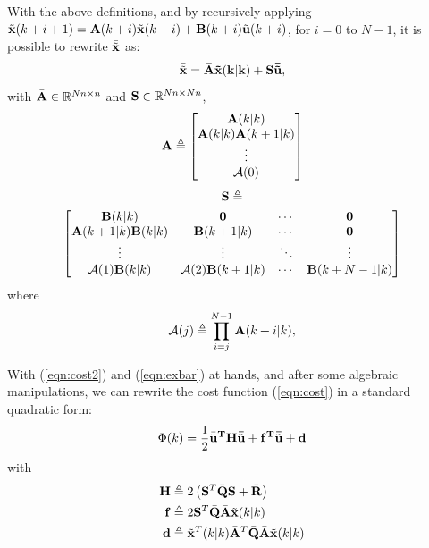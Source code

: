 \documentclass[twocolumn]{IEEEtran} %
\newcommand\real{\mathbb{R}}
\begin{document}
With the above definitions, and by recursively applying $\tilde{\bf x}(k+i+1)={\bf A}(k+i)\tilde{\bf x}(k+i)+{\bf B}(k+i)\tilde{\bf u}(k+i)$, for $i=0$ to $N-1$, it is possible to rewrite $\bar{\tilde{\bf x}}$ as:
\begin{equation}\label{eqn:exbar}
	\bar{\tilde{\bf x}}=\bar{\bf A}\tilde{\bf x}(k|k)+{\bf S}\bar{\tilde{\bf u}},
\end{equation}
with $\bar{\bf A}\in\real^{Nn\times n}$ and ${\bf S}\in\real^{Nn\times Nn}$,
\begin{equation*}
	\bar{\bf A} \triangleq \begin{bmatrix}
		{\bf A}(k|k) \\ {\bf A}(k|k){\bf A}(k+1|k) \\ \vdots \\ {\cal A}(0)
	\end{bmatrix}
\end{equation*}
{\small
\begin{multline*}
		{\bf S} \triangleq \\ \begin{bmatrix}
			{\bf B}(k|k)		  & {\bf 0} 			   & \cdots & {\bf 0}        \\
			{\bf A}(k+1|k){\bf B}(k|k)& {\bf B}(k+1|k)      	   & \cdots & {\bf 0}        \\
			\vdots			  & \vdots		        & \ddots & \vdots         \\
			{\cal A}(1){\bf B}(k|k) & {\cal A}(2){\bf B}(k+1|k) & \cdots & {\bf B}(k+N-1|k)
		\end{bmatrix}
\end{multline*}
}
where 
\begin{equation*}
	{\cal A}(j) \triangleq \prod_{i=j}^{N-1}{\bf A}(k+i|k),
\end{equation*}

With (\ref{eqn:cost2}) and (\ref{eqn:exbar}) at hands, and after some algebraic manipulations, we can rewrite the cost function (\ref{eqn:cost}) in a standard quadratic form:
\begin{equation}
	\Phi(k) = \frac{1}{2}\bar{\tilde{\bf u}}^T{\bf H}\bar{\tilde{\bf u}} + {\bf f}^T\bar{\tilde{\bf u}} + {\bf d}
\end{equation}
with
\begin{align*}
	{\bf H} &\triangleq 2\left({\bf S}^T\bar{\bf Q}{\bf S}+\bar{\bf R}\right) \\
	{\bf f} &\triangleq 2{\bf S}^T\bar{\bf Q}\bar{\bf A}\tilde{\bf x}(k|k) \\
	{\bf d} &\triangleq \tilde{\bf x}^T(k|k)\bar{\bf A}^T\bar{\bf Q}\bar{\bf A}\tilde{\bf x}(k|k)
\end{align*}
\end{document}
